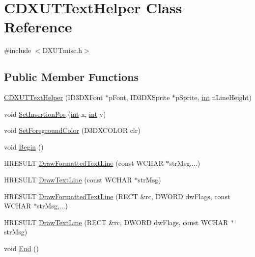 \hypertarget{class_c_d_x_u_t_text_helper}{
\section{CDXUTTextHelper Class Reference}
\label{class_c_d_x_u_t_text_helper}
}


{\ttfamily \#include $<$DXUTmisc.h$>$}\subsection*{Public Member Functions}
\begin{DoxyCompactItemize}
\item 
\hyperlink{class_c_d_x_u_t_text_helper_a7ddd666bfdc63ecd39d80516a45e2924}{CDXUTTextHelper} (ID3DXFont $\ast$pFont, ID3DXSprite $\ast$pSprite, \hyperlink{_d_x_u_tgui_8cpp_a2d77ed03302b6978834ee3b6f57837fb}{int} nLineHeight)
\item 
void \hyperlink{class_c_d_x_u_t_text_helper_afa59908c522b99f026652c12344d0a45}{SetInsertionPos} (\hyperlink{_d_x_u_tgui_8cpp_a2d77ed03302b6978834ee3b6f57837fb}{int} x, \hyperlink{_d_x_u_tgui_8cpp_a2d77ed03302b6978834ee3b6f57837fb}{int} y)
\item 
void \hyperlink{class_c_d_x_u_t_text_helper_a9ae933e832dddf394737b7e6c5b970d2}{SetForegroundColor} (D3DXCOLOR clr)
\item 
void \hyperlink{class_c_d_x_u_t_text_helper_af89af0e0f1384754d03b5461f0d7f722}{Begin} ()
\item 
HRESULT \hyperlink{class_c_d_x_u_t_text_helper_ac0a795044c9d27c5d2163af1f41423d4}{DrawFormattedTextLine} (const WCHAR $\ast$strMsg,...)
\item 
HRESULT \hyperlink{class_c_d_x_u_t_text_helper_a57d1d7b2fc521fd837f17647b4e2bec2}{DrawTextLine} (const WCHAR $\ast$strMsg)
\item 
HRESULT \hyperlink{class_c_d_x_u_t_text_helper_ad6d92ed3fe48d59442e33a4366830479}{DrawFormattedTextLine} (RECT \&rc, DWORD dwFlags, const WCHAR $\ast$strMsg,...)
\item 
HRESULT \hyperlink{class_c_d_x_u_t_text_helper_ab0bfaac9948007694f0dbecfe8dc6aba}{DrawTextLine} (RECT \&rc, DWORD dwFlags, const WCHAR $\ast$strMsg)
\item 
void \hyperlink{class_c_d_x_u_t_text_helper_a505f277a35d77a60d475e10d18863852}{End} ()
\end{DoxyCompactItemize}
